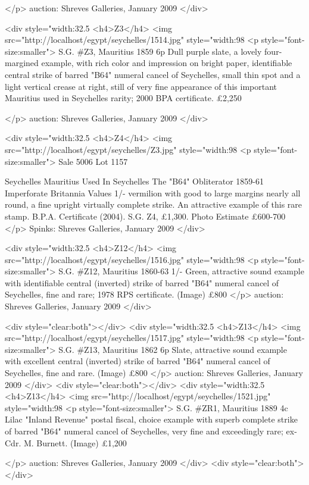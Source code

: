 \documentclass[10pt,oneside,justified]{tufte-book}     %
\def\pound{\pounds}
\begin{document}
</p>
{{auction: Shreves Galleries, January 2009}}
</div>



<div style="width:32.5%
<h4>Z3</h4>
<img src="http://localhost/egypt/seychelles/1514.jpg" style="width:98%
<p style="font-size:smaller"> 
S.G. \#Z3, Mauritius 1859 6p Dull purple slate, a lovely four-margined example, 
with rich color and impression on bright paper, identifiable central strike of barred "B64" 
numeral cancel of Seychelles, small thin spot and a light vertical crease at right, still of very fine 
appearance of this important Mauritius used in Seychelles rarity; 2000 BPA certificate.  \pound 2,250

</p>
{{auction: Shreves Galleries, January 2009}}
</div>


<div style="width:32.5%
<h4>Z4</h4>
<img src="http://localhost/egypt/seychelles/Z3.jpg" style="width:98%
<p style="font-size:smaller"> 
Sale 5006 Lot 1157

Seychelles
Mauritius Used In Seychelles
The "B64" Obliterator
1859-61 Imperforate Britannia Values
1/- vermilion with good to large margins nearly all round, a fine upright virtually complete strike. An attractive example of this rare stamp. B.P.A. Certificate (2004). S.G. Z4, \pound1,300. Photo
Estimate \pound 600-700 
</p>
{{Spinks: Shreves Galleries, January 2009}}
</div>

<div style="width:32.5%
<h4>Z12</h4>
<img src="http://localhost/egypt/seychelles/1516.jpg" style="width:98%
<p style="font-size:smaller"> 
S.G. \#Z12, Mauritius 1860-63 1/- Green, attractive sound example with identifiable central (inverted) strike of barred 
"B64" numeral cancel of Seychelles, fine and rare; 1978 RPS certificate. (Image) 	\pound800 
</p>
{{auction: Shreves Galleries, January 2009}}
</div>

<div style="clear:both"></div>
<div style="width:32.5%
<h4>Z13</h4>
<img src="http://localhost/egypt/seychelles/1517.jpg" style="width:98%
<p style="font-size:smaller"> 
S.G. \#Z13, Mauritius 1862 6p Slate, attractive sound example with excellent central (inverted) 
strike of barred "B64" numeral cancel of Seychelles, fine and rare. (Image) 	\pound800 
</p>
{{auction: Shreves Galleries, January 2009}}
</div>
<div style="clear:both"></div>
<div style="width:32.5%
<h4>Z13</h4>
<img src="http://localhost/egypt/seychelles/1521.jpg" style="width:98%
<p style="font-size:smaller"> 
S.G. \#ZR1, Mauritius 1889 4c Lilac "Inland Revenue" postal fiscal, choice example with superb complete strike of barred "B64" numeral cancel of Seychelles, very fine and exceedingly rare; ex-Cdr. M. Burnett. (Image) 	\pound1,200

</p>
{{auction: Shreves Galleries, January 2009}}
</div>
<div style="clear:both"></div>



          
\end{document}
